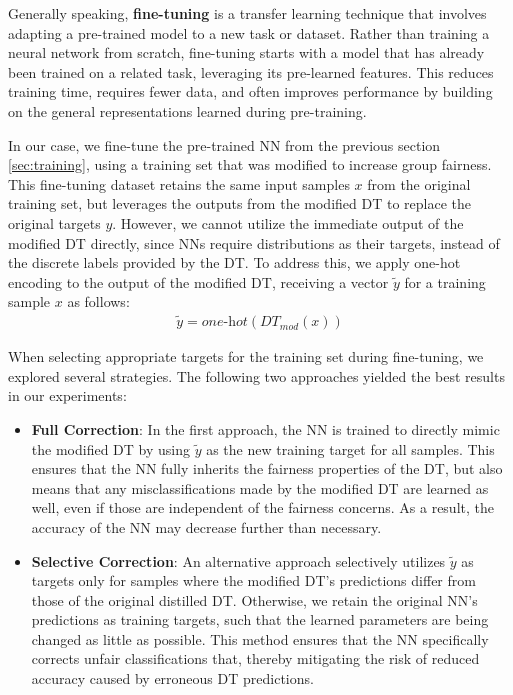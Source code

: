 Generally speaking, \textbf{fine-tuning} \cite{fine_tuning} is a transfer learning technique
that involves adapting a pre-trained model to a new task or dataset.
Rather than training a neural network from scratch,
fine-tuning starts with a model that has already been trained on a related task,
leveraging its pre-learned features.
This reduces training time, requires fewer data, and often improves performance
by building on the general representations learned during pre-training.

In our case, we fine-tune the pre-trained NN from the previous section \ref{sec:training},
using a training set that was modified to increase group fairness.
This fine-tuning dataset retains the same input samples $x$ from the original training set,
but leverages the outputs from the modified DT to replace the original targets $y$.
However, we cannot utilize the immediate output of the modified DT directly, since NNs require distributions as their targets,
instead of the discrete labels provided by the DT.
To address this, we apply one-hot encoding to the output of the modified DT,
receiving a vector $\tilde{y}$ for a training sample $x$ as follows:
\begin{align}
    \tilde{y} = \textit{one-hot}(\textit{DT}_{mod}(x))
\end{align}

When selecting appropriate targets for the training set during fine-tuning,
we explored several strategies.
The following two approaches yielded the best results in our experiments:

\begin{itemize}  
    \item \textbf{Full Correction}:  
    In the first approach, the NN is trained to directly mimic the modified DT by using $\tilde{y}$ as the new training target for all samples.
    This ensures that the NN fully inherits the fairness properties of the DT, but also means that any misclassifications made by the modified DT are learned as well,
    even if those are independent of the fairness concerns.
    As a result, the accuracy of the NN may decrease further than necessary. 

    \item \textbf{Selective Correction}:  
    An alternative approach selectively utilizes $\tilde{y}$ as targets only for samples where the modified DT's predictions differ from those of the original distilled DT.
    Otherwise, we retain the original NN's predictions as training targets, such that the learned parameters are being changed as little as possible.
    This method ensures that the NN specifically corrects unfair classifications that, thereby mitigating the risk of reduced accuracy caused by erroneous DT predictions.
\end{itemize}  

